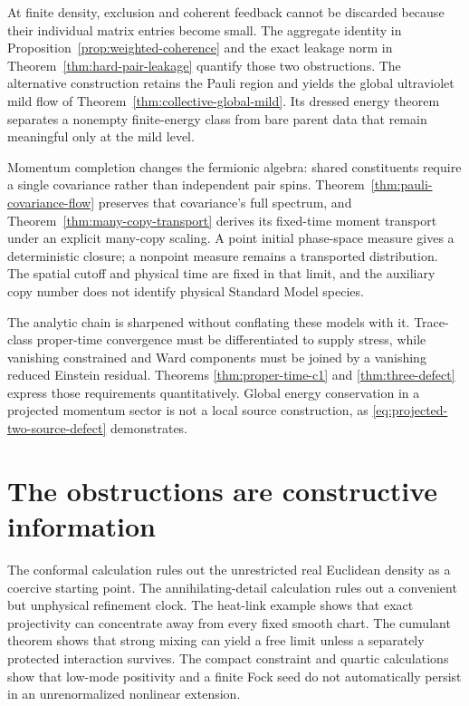 \documentclass[11pt,a4paper,oneside]{book}
\theoremstyle{plain}
\theoremstyle{definition}
\theoremstyle{remark}
\begin{document}
At finite density, exclusion and coherent feedback cannot be discarded
because their individual matrix entries become small.  The aggregate
identity in Proposition~\ref{prop:weighted-coherence} and the exact
leakage norm in Theorem~\ref{thm:hard-pair-leakage} quantify those two
obstructions.  The alternative construction retains the Pauli region
and yields the global ultraviolet mild flow of
Theorem~\ref{thm:collective-global-mild}.  Its dressed energy theorem
separates a nonempty finite-energy class from bare parent data that
remain meaningful only at the mild level.

Momentum completion changes the fermionic algebra: shared constituents
require a single covariance rather than independent pair spins.
Theorem~\ref{thm:pauli-covariance-flow} preserves that covariance's full
spectrum, and Theorem~\ref{thm:many-copy-transport} derives its
fixed-time moment transport under an explicit many-copy scaling.
A point initial phase-space measure gives a deterministic closure;
a nonpoint measure remains a transported distribution.  The spatial
cutoff and physical time are fixed in that limit, and the auxiliary
copy number does not identify physical Standard Model species.

The analytic chain is sharpened without conflating these models with it.
Trace-class proper-time convergence must be differentiated to supply
stress, while vanishing constrained and Ward components must be joined
by a vanishing reduced Einstein residual.  Theorems
\ref{thm:proper-time-c1} and \ref{thm:three-defect} express those
requirements quantitatively.  Global energy conservation in a projected
momentum sector is not a local source construction, as
\eqref{eq:projected-two-source-defect} demonstrates.

\section{The obstructions are constructive information}
The conformal calculation rules out the unrestricted real Euclidean density as a coercive starting point. The annihilating-detail calculation rules out a convenient but unphysical refinement clock. The heat-link example shows that exact projectivity can concentrate away from every fixed smooth chart. The cumulant theorem shows that strong mixing can yield a free limit unless a separately protected interaction survives. The compact constraint and quartic calculations show that low-mode positivity and a finite Fock seed do not automatically persist in an unrenormalized nonlinear extension.
\end{document}
